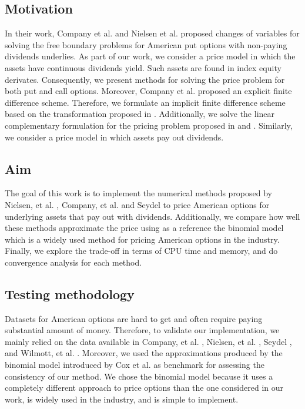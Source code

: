 \subsection{Motivation}

In their work, Company et al. \cite*{company_egorova_jodar_2014} and Nielsen 
et al. \cite*{nielsen_2001} proposed changes of variables for solving the free
boundary problems for American put options with non-paying dividends underlies.
 As part of our work, we consider a price model in which
the assets have continuous dividends yield. Such assets are found in index
equity derivates. Consequently, we present methods for solving the price problem
for both put and call options. Moreover, Company et al. \cite*{company_egorova_jodar_2014} 
proposed an explicit finite difference scheme. Therefore, we formulate an implicit 
finite difference scheme based on the transformation proposed in 
\cite*{company_egorova_jodar_2014}. Additionally, we solve the linear complementary
formulation for the pricing problem proposed in \cite*{seydel_2009} and 
\cite*{wilmott_howison_dewynne_1995}. Similarly, we consider a price model in which
assets pay out dividends.

\subsection{Aim} 

The goal of this work is to implement the numerical methods proposed by 
Nielsen, et al. \cite{nielsen_2001}, Company, et al. \cite{company_egorova_jodar_2014}
and Seydel \cite*{seydel_2009} to price American options for underlying assets 
that pay out with dividends. Additionally, we compare how well these methods approximate 
the price using as a reference the binomial model which is a widely used method 
for pricing American options in the industry. Finally, we explore the 
trade-off in terms of CPU time and memory, and do convergence analysis for each method.

\subsection{Testing methodology}

Datasets for American options are hard to get and often require paying substantial
amount of money. Therefore, to validate our implementation, we mainly relied on the data available in Company, 
et al. \cite*{company_egorova_jodar_2014}, Nielsen, et al. \cite*{nielsen_2001}, 
Seydel \cite*{seydel_2009}, and Wilmott, et al. \cite*{wilmott_howison_dewynne_1995}.
Moreover, we used the approximations produced by the binomial model 
introduced by Cox et al. \cite{cox_1979} as benchmark for assessing the consistency 
of our method. We chose the binomial model because it uses a completely different 
approach to price options than the one considered in our work, is widely used in
the industry, and is simple to implement. 


